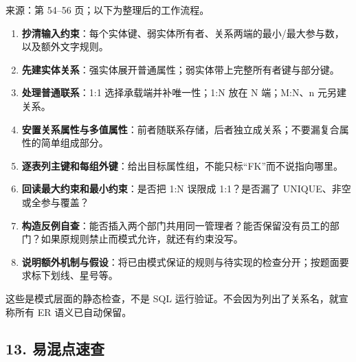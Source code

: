 来源：第 54--56 页；以下为整理后的工作流程。

\begin{enumerate}
\def\labelenumi{\arabic{enumi}.}
\tightlist
\item
  \textbf{抄清输入约束}：每个实体键、弱实体所有者、关系两端的最小/最大参与数，以及额外文字规则。
\item
  \textbf{先建实体关系}：强实体展开普通属性；弱实体带上完整所有者键与部分键。
\item
  \textbf{处理普通联系}：1:1 选择承载端并补唯一性；1:N 放在 N 端；M:N、n 元另建关系。
\item
  \textbf{安置关系属性与多值属性}：前者随联系存储，后者独立成关系；不要漏复合属性的简单组成部分。
\item
  \textbf{逐表列主键和每组外键}：给出目标属性组，不能只标``FK''而不说指向哪里。
\item
  \textbf{回读最大约束和最小约束}：是否把 1:N 误限成 1:1？是否漏了 UNIQUE、非空或全参与覆盖？
\item
  \textbf{构造反例自查}：能否插入两个部门共用同一管理者？能否保留没有员工的部门？如果原规则禁止而模式允许，就还有约束没写。
\item
  \textbf{说明额外机制与假设}：将已由模式保证的规则与待实现的检查分开；按题面要求标下划线、星号等。
\end{enumerate}

这些是模式层面的静态检查，不是 SQL 运行验证。不会因为列出了关系名，就宣称所有 ER 语义已自动保留。

\subsection{13. 易混点速查}\label{04_er_to_relational_mapping_zh-ux6613ux6df7ux70b9ux901fux67e5}

